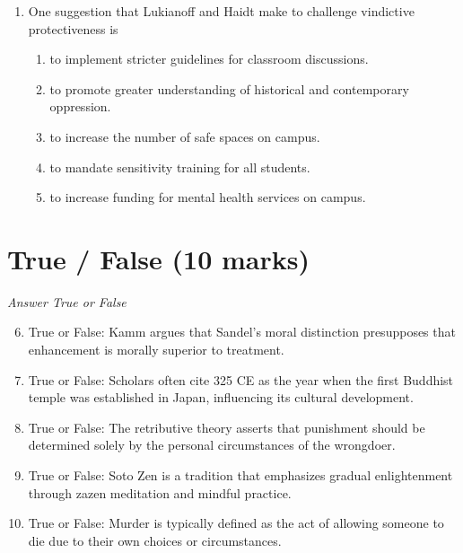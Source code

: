 \documentclass[12pt]{article}
\begin{document}
\begin{enumerate}[label=\arabic*.]
\begin{enumerate}[label=(\alph*)]
    \item it is impossible for humans to judge what is holy.
    \item there are many other things that are also holy.
    \item the concept of 'wrongdoing' is too subjective to define holiness.
    \item only gods can decide who the wrongdoers are.
    \item Euthyphro is not a reliable authority on what is holy.
\end{enumerate}
\item One suggestion that Lukianoff and Haidt make to challenge vindictive protectiveness is
\begin{enumerate}[label=(\alph*)]
    \item to implement stricter guidelines for classroom discussions.
    \item to promote greater understanding of historical and contemporary oppression.
    \item to increase the number of safe spaces on campus.
    \item to mandate sensitivity training for all students.
    \item to increase funding for mental health services on campus.
\end{enumerate}
\end{enumerate}

\section*{True / False (10 marks)}
\textit{Answer True or False}
\begin{enumerate}[label=\arabic*.]
\setcounter{enumi}{5}
\item True or False: Kamm argues that Sandel's moral distinction presupposes that enhancement is morally superior to treatment.
\item True or False: Scholars often cite 325 CE as the year when the first Buddhist temple was established in Japan, influencing its cultural development.
\item True or False: The retributive theory asserts that punishment should be determined solely by the personal circumstances of the wrongdoer.
\item True or False: Soto Zen is a tradition that emphasizes gradual enlightenment through zazen meditation and mindful practice.
\item True or False: Murder is typically defined as the act of allowing someone to die due to their own choices or circumstances.
\end{enumerate}
\end{document}
